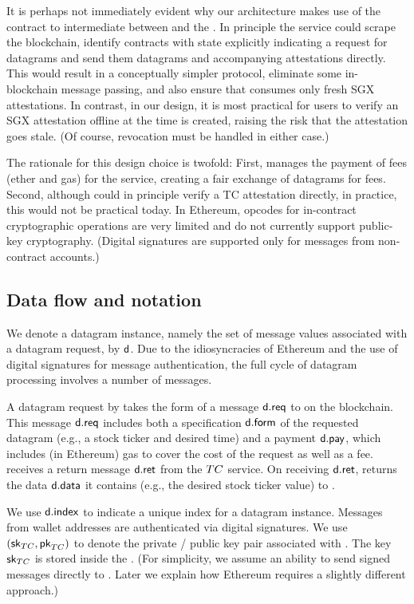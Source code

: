 It is perhaps not immediately evident why our architecture makes use of the contract \tcont to intermediate between \reqcont and the \encname. In principle the \tc service could scrape the blockchain, identify contracts with state explicitly indicating a request for datagrams and send them datagrams and accompanying attestations directly.  This would result in a conceptually simpler protocol, eliminate some in-blockchain message passing, and also ensure that \reqcont consumes only fresh SGX attestations. In contrast, in our design, it is most practical for users to verify an SGX attestation offline at the time \reqcont is created, raising the risk that the attestation goes stale. (Of course, revocation must be handled in either case.)

The rationale for this design choice is twofold: First, \tcont manages the payment of fees (ether and gas) for the \tc service, creating a fair exchange of datagrams for fees. Second, although \reqcont could in principle verify a TC attestation directly, in practice, this would not be practical today. In Ethereum, opcodes for in-contract cryptographic operations are very limited and do not currently support public-key cryptography. (Digital signatures are supported only for messages from non-contract accounts.) 



\subsection{Data flow and notation}

We denote a datagram instance, namely the set of message values associated with a datagram request, by ${\sf d}$. Due to the idiosyncracies of Ethereum and the use of digital signatures for message authentication, the full cycle of datagram processing involves a number of messages. 

A datagram request by \reqcont takes the form of a message ${\sf d.req}$ to \tcont on the blockchain. This message ${\sf d.req}$ includes both a specification ${\sf d.form}$ of the requested datagram (e.g., a stock ticker and desired time) and a payment ${\sf d.pay}$, which includes (in Ethereum) gas to cover the cost of the request as well as a fee. \tcont receives a return message ${\sf d.ret}$ from the $TC$ service. On receiving ${\sf d.ret}$, \tcont returns the data ${\sf d.data}$ it contains (e.g., the desired stock ticker value) to \reqcont. 

We use ${\sf d.index}$ to indicate a unique index for a datagram instance. Messages from wallet addresses are authenticated via digital signatures. We use $({{\sf sk}_{TC}}, {\sf pk}_{TC})$ to denote the private / public key pair associated with \tcadd. The key ${{\sf sk}_{TC}}$ is stored inside the \encname. (For simplicity, we assume an ability to send signed messages directly to \tcont. Later we explain how Ethereum requires a slightly different approach.)



